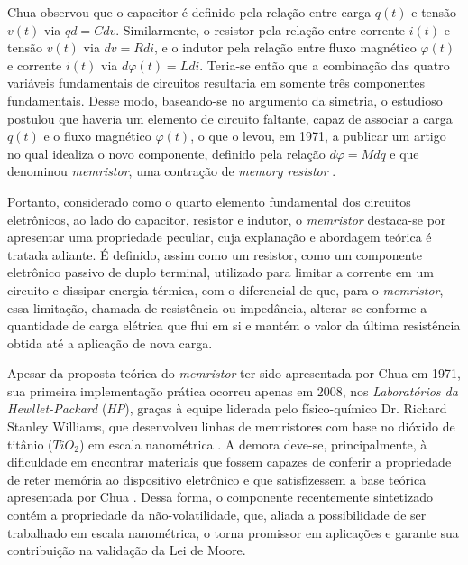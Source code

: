 \documentclass{ceel}
\begin{document}
\begin{multicols}{2}
Chua observou que o capacitor é definido pela relação entre carga $q(t)$ e tensão $v(t)$ via $qd=C dv$. Similarmente, o resistor pela relação entre corrente $i(t)$ e tensão $v(t)$ via $dv=R di$, e o indutor pela relação entre fluxo magnético $\varphi(t)$ e corrente $i(t)$ via $d\varphi(t)=L di$. Teria-se então que a combinação das quatro variáveis fundamentais de circuitos resultaria em somente três componentes fundamentais.
Desse modo, baseando-se no argumento da simetria, o estudioso postulou que haveria um elemento de circuito faltante, capaz de associar a carga $q(t)$ e o fluxo magnético $\varphi(t)$, o que o levou, em 1971, a publicar um artigo no qual idealiza o novo componente, definido pela relação $d\varphi=M dq$ e que denominou \emph{memristor}, uma contração de \emph{memory resistor} \cite{artigo}. 

Portanto, considerado como o quarto elemento fundamental dos circuitos eletrônicos, ao lado do capacitor, resistor e indutor, o \emph{memristor} destaca-se por apresentar uma propriedade peculiar, cuja explanação e abordagem teórica é tratada adiante. É definido, assim como um resistor, como um componente eletrônico passivo de duplo terminal, utilizado para limitar a corrente em um circuito e dissipar energia térmica, com o diferencial de que, para o \emph{memristor}, essa limitação, chamada de resistência ou impedância, alterar-se conforme a quantidade de carga elétrica que flui em si e mantém o valor da última resistência obtida até a aplicação de nova carga.

Apesar da proposta teórica do \emph{memristor} ter sido apresentada por Chua em 1971, sua primeira implementação prática ocorreu apenas em 2008, nos \emph{Laboratórios da Hewllet-Packard} (\emph{HP}), graças à equipe liderada pelo físico-químico Dr. Richard Stanley Williams, que desenvolveu linhas de memristores com base no dióxido de titânio ($TiO_2$) em escala nanométrica \cite{nature}. A demora deve-se, principalmente, à dificuldade em encontrar materiais que fossem capazes de conferir a propriedade de reter memória ao dispositivo eletrônico e que satisfizessem a base teórica apresentada por Chua \cite{artigo}.
Dessa forma, o componente recentemente sintetizado contém a propriedade da não-volatilidade, que, aliada a possibilidade de ser trabalhado em escala nanométrica, o torna promissor em aplicações e garante sua contribuição na validação da Lei de Moore.


\end{multicols}
\end{document}
